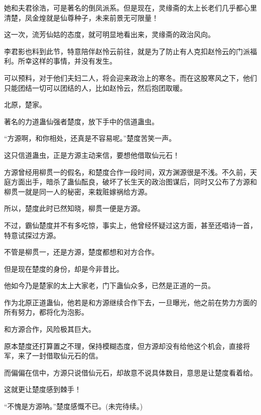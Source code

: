 \begin{this_body}
她和夫君徐浩，可是著名的倒凤派系。但是现在，灵缘斋的太上长老们几乎都心里清楚，凤金煌就是仙尊种子，未来前景无可限量！

这一次，流芳仙姑的态度，就可明显地看出来，灵缘斋的政治风向。

李君影也料到此节，特意陪伴赵怜云前往，就是为了防止有人克扣赵怜云的门派福利。所幸这样的事情，并没有发生。

可以预料，对于他们夫妇二人，将会迎来政治上的寒冬。而在这股寒风之下，他们只能团结一切可以团结的人，比如赵怜云，然后抱团取暖。

北原，楚家。

著名的力道蛊仙强者楚度，放下手中的信道蛊虫。

“方源啊，和你相处，还真是不容易呢。”楚度苦笑一声。

这只信道蛊虫，正是方源主动来信，要想他借取仙元石！

方源曾经用柳贯一的假名，和楚度合作一段时间，双方渊源很是不浅。不久前，天庭方面出手，暗杀了蛊仙酝良，破坏了长生天的政治图谋后，同时又公布了方源和柳贯一就是同一人的秘密，来栽赃嫁祸给方源。

所以，楚度此时已然知晓，柳贯一便是方源。

不过，霸仙楚度并不有多吃惊，事实上，他曾经怀疑过这方面，甚至还唱诗一首，特意试探过方源。

不管是柳贯一，还是方源，楚度都想和对方合作。

但是现在楚度的身份，却是今非昔比。

他如今乃是楚家的太上大家老，门下蛊仙众多，已然是正道的一员。

作为北原正道蛊仙，他若是和方源继续合作下去，一旦曝光，他之前在势力方面的所有努力，都将化为泡影。

和方源合作，风险极其巨大。

原本楚度还打算置之不理，保持模糊态度，但方源却没有给他这个机会，直接将军，来了一封借取仙元石的信。

而偏偏在信中，方源只说借仙元石，却故意不说具体数目，意思是让楚度看着给。

这就更让楚度感到棘手！

“不愧是方源呐。”楚度感慨不已。(未完待续。)

\end{this_body}

